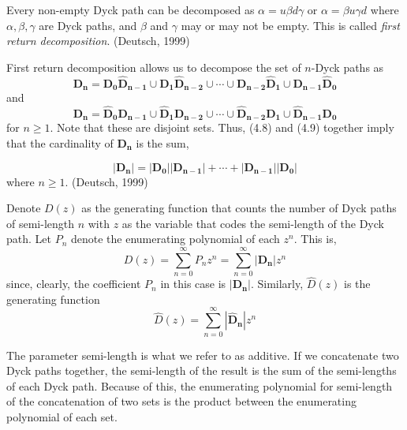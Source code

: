 \documentclass[12pt]{article}
\theoremstyle{definition}
\numberwithin{equation}{section}
\begin{document}
Every non-empty Dyck path can be decomposed as $\alpha = u\beta d\gamma$ or $\alpha = \beta u\gamma d$ where $\alpha, \beta,\gamma$ are Dyck paths, and $\beta$ and $\gamma$ may or may not be empty. This is called \emph{first return decomposition}. (Deutsch, 1999)

First return decomposition allows us to decompose the set of $n$-Dyck paths as
\begin{equation}
    \mathbf{D_n} = \mathbf{D_0}\mathbf{\hat{D}_{n-1}}\cup\mathbf{D_1}\mathbf{\hat{D}_{n-2}}\cup\cdots\cup \mathbf{D_{n-2}}\mathbf{\hat{D}_1}\cup \mathbf{D_{n-1}}\mathbf{\hat{D}_0}
\end{equation}
and
\begin{equation}
     \mathbf{D_n} = \mathbf{\hat{D}_0}\mathbf{D_{n-1}}\cup\mathbf{\hat{D}_1}\mathbf{D_{n-2}}\cup\cdots\cup \mathbf{\hat{D}_{n-2}}\mathbf{D_1}\cup \mathbf{\hat{D}_{n-1}}\mathbf{D_0}
\end{equation} 
for $n\geq 1$.
Note that these are disjoint sets. Thus, (4.8) and (4.9) together imply that the cardinality of $\mathbf{D_n}$ is the sum,

\begin{equation}
    |\mathbf{D_n}| = |\mathbf{D_0}||\mathbf{D_{n-1}}| + \cdots + |\mathbf{D_{n-1}}||\mathbf{D_0}|
\end{equation}
where $n\geq 1$. (Deutsch, 1999)

Denote $D(z)$ as the generating function that counts the number of Dyck paths of semi-length $n$ with $z$ as the variable that codes the semi-length of the Dyck path. Let $P_n$ denote the enumerating polynomial of each $z^n$. This is,
\begin{equation}
    D(z) = \sum_{n = 0}^\infty P_nz^n = \sum_{n=0}^\infty |\mathbf{D_n}|z^n
\end{equation}
since, clearly, the coefficient $P_n$ in this case is $|\mathbf{D_n}|$. %
Similarly, $\hat{D}(z)$ is the generating function
\begin{equation}
    \hat{D}(z) = \sum_{n=0}^\infty |\mathbf{\hat{D}_n}|z^n
\end{equation}


The parameter semi-length is what we refer to as additive. If we concatenate two Dyck paths together, the semi-length of the result is the sum of the semi-lengths of each Dyck path. Because of this, the enumerating polynomial for semi-length of the concatenation of two sets is the product between the enumerating polynomial of each set.
\end{document}
